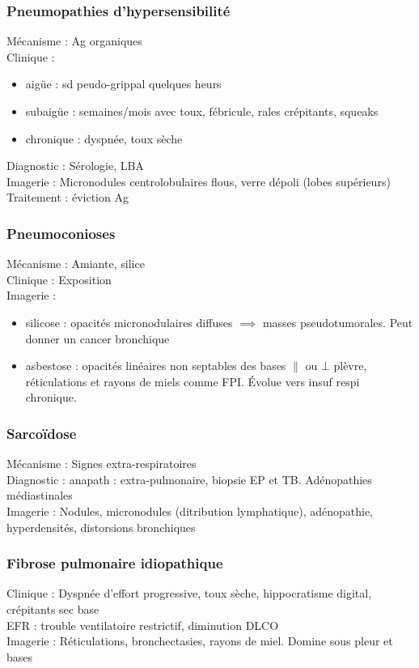 \subsubsection{Pneumopathies d'hypersensibilité}
Mécanisme : Ag organiques\\
Clinique : 
\begin{itemize}
\item aigüe : sd peudo-grippal quelques heurs
\item subaigüe : semaines/mois avec toux, fébricule, rales crépitants, squeaks
\item chronique : dyspnée, toux sèche
\end{itemize}
Diagnostic : Sérologie, LBA\\
Imagerie : Micronodules centrolobulaires flous, verre dépoli (lobes supérieurs)\\
Traitement : éviction Ag

\subsubsection{Pneumoconioses}
Mécanisme : Amiante, silice\\
Clinique : Exposition\\
Imagerie : 
\begin{itemize}
\item silicose : opacités micronodulaires diffuses \(\implies\) masses pseudotumorales. Peut donner un cancer bronchique
\item asbestose : opacités linéaires non septables des bases \(\parallel\) ou \(\bot\) plèvre, réticulations et rayons de miels comme FPI. Évolue vers insuf respi chronique.
\end{itemize}

\subsubsection{Sarcoïdose}
Mécanisme : Signes extra-respiratoires\\
Diagnostic : anapath : extra-pulmonaire, biopsie EP et TB. Adénopathies médiastinales \\
Imagerie : Nodules, micronodules (ditribution lymphatique), adénopathie, hyperdensités, distorsions bronchiques

\subsubsection{Fibrose pulmonaire idiopathique}
Clinique : Dyspnée d'effort progressive, toux sèche, hippocratisme digital, crépitants sec base\\
EFR : trouble ventilatoire restrictif, diminution DLCO\\
Imagerie : Réticulations, bronchectasies, rayons de miel. Domine sous pleur et bases

